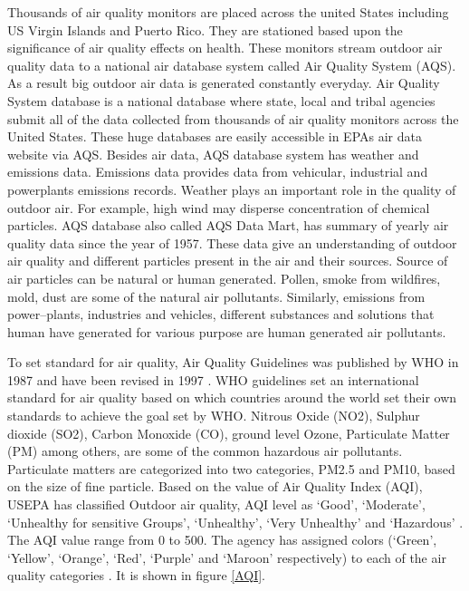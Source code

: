 \documentclass[sigconf]{acmart}
\begin{document}
   Thousands of air quality monitors are placed  across the united States including US Virgin Islands and Puerto Rico. They are stationed based upon the significance of air quality effects on health.  These monitors stream outdoor air quality data to a national air database system called Air Quality System (AQS). As a result big outdoor air data is generated constantly everyday. Air Quality System database is a national database where state, local and tribal agencies submit all of the
   data collected from thousands of air quality monitors across the United States. These huge databases are easily accessible in EPAs air data website via AQS. Besides air data, AQS database system has
   weather and emissions data. Emissions data provides data from vehicular, industrial and powerplants emissions records. Weather plays an important role in the quality of outdoor air. For example, high wind may disperse concentration of chemical particles. AQS database also called AQS Data Mart, has summary of yearly air quality data since the year of 1957. These data give an understanding of outdoor air quality and different particles present in the air and their sources. Source of air particles can be natural or human generated. Pollen, smoke from wildfires, mold, dust are some of the natural air pollutants. Similarly, emissions from
   power--plants, industries and vehicles, different substances and solutions that human have generated for various purpose are human generated air pollutants. 

   To set standard for air quality, Air Quality Guidelines was published by WHO in 1987 and have been revised in 1997 \cite{who-health-topics}. WHO guidelines set an international standard for air quality based on which countries around the world set their own standards to achieve the goal set by WHO. 
   Nitrous Oxide (NO2), Sulphur dioxide (SO2), Carbon Monoxide (CO), ground level Ozone, Particulate Matter (PM) among others, are some of the common hazardous air pollutants. Particulate matters are categorized into two categories, PM2.5 and PM10, based on the size of fine particle. Based on the value of Air Quality Index (AQI), USEPA has classified Outdoor air quality, AQI level as `Good', `Moderate', `Unhealthy for sensitive Groups', `Unhealthy',
   `Very Unhealthy' and `Hazardous' \cite{airnow-gov}. The AQI value range from 0 to 500. The agency has assigned colors (`Green', `Yellow', `Orange', `Red', `Purple' and `Maroon' respectively) to each of the air quality categories \cite{airnow-gov}. It is shown in figure \ref{AQI}.
\end{document}
